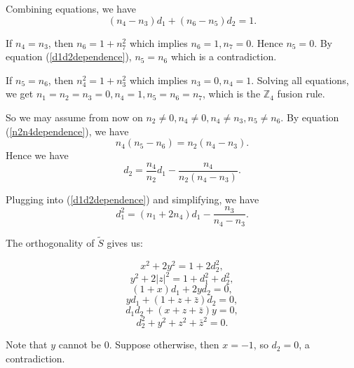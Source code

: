 \documentclass[12pt,psamsfonts]{amsart}
\newcommand{\Z}{\mathbb Z}
\newcommand{\tS}{\tilde{S}}
\numberwithin{equation}{section}
\theoremstyle{definition}
\begin{document}
 Combining equations, we have
 \begin{equation}\label{d1d2dependence}
 (n_4-n_3)d_1+(n_6-n_5)d_2=1.
 \end{equation}

 If $n_4=n_3$, then $n_6=1+n_7^2$ which implies $n_6=1,n_7=0$.
 Hence $n_5=0$.  By equation (\ref{d1d2dependence}), $n_5=n_6$ which is a contradiction.

 If $n_5=n_6$, then $n_4^2=1+n_3^2$ which implies $n_3=0,n_4=1$.
 Solving all equations, we get $n_1=n_2=n_3=0,n_4=1,n_5=n_6=n_7$,
 which is the $\Z_4$ fusion rule.

 So we may assume from now on $n_2\neq 0, n_4\neq 0, n_4\neq n_3,
 n_5\neq n_6$.
 By equation (\ref{n2n4dependence}), we have
 \begin{equation}
 n_4(n_5-n_6)=n_2(n_4-n_3).
 \end{equation}
 Hence we have
 \begin{equation}
 d_2=\frac{n_4}{n_2}d_1-\frac{n_4}{n_2(n_4-n_3)}.
 \end{equation}

Plugging into (\ref{d1d2dependence}) and simplifying, we have
\begin{equation}\label{d1square}
d_1^2=(n_1+2n_4)d_1-\frac{n_3}{n_4-n_3}.
\end{equation}

The orthogonality of $\tS$ gives us:

\begin{equation}\label{xysquare}
x^2+2y^2=1+2d_2^2,
\end{equation}
\begin{equation}
y^2+2|z|^2=1+d_1^2+d_2^2,
\end{equation}
\begin{equation}\label{xd}
(1+x)d_1+2yd_2=0,
\end{equation}
\begin{equation}\label{d1d2z}
yd_1+(1+z+\bar{z})d_2=0,
\end{equation}
\begin{equation}\label{zz}
d_1d_2+(x+z+\bar{z})y=0,
\end{equation}
\begin{equation}
d_2^2+y^2+z^2+\bar{z}^2=0.
\end{equation}

Note that $y$ cannot be $0$.  Suppose otherwise, then $x=-1$, so $d_2=0$, a contradiction.
\end{document}
